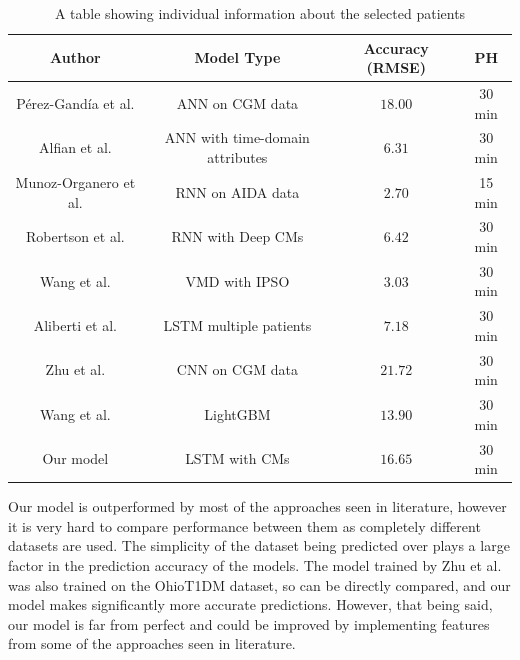       \begin{table}[H]
        \begin{center}
          \caption{A table showing individual information about the selected patients}
          \begin{tabular}{||c c c c||} 
          \hline
          Author & Model Type & Accuracy (RMSE) & PH \\ [0.5ex] 
          \hline\hline
          Pérez-Gandía et al. \cite{paper3} & ANN on CGM data & $18.00$ & 30 min \\ 
          \hline
          Alfian et al. \cite{paper5} & ANN with time-domain attributes & $6.31$ & 30 min \\
          \hline
          Munoz-Organero et al. \cite{paper6} & RNN on AIDA data & $2.70$ & 15 min \\
          \hline
          Robertson et al. \cite{paper1} & RNN with Deep CMs & $6.42$ & 30 min \\
          \hline
          Wang et al. \cite{paper8} & VMD with IPSO & $3.03$ & 30 min \\
          \hline
          Aliberti et al. \cite{paper9} & LSTM multiple patients & $7.18$ & 30 min \\
          \hline
          Zhu et al. \cite{paper7} & CNN on CGM data & $21.72$ & 30 min \\
          \hline
          Wang et al. \cite{paper10} & LightGBM & $13.90$ & 30 min \\
          \hline
          Our model & LSTM with CMs & $16.65$ & 30 min \\ [1ex]
          \hline 
          \end{tabular}
        \end{center}
      \end{table}

      Our model is outperformed by most of the approaches seen in literature, however it is very hard to compare performance between them as completely different datasets are used. The simplicity of the dataset being predicted over plays a large factor in the prediction accuracy of the models. The model trained by Zhu et al. \cite{paper7} was also trained on the OhioT1DM dataset, so can be directly compared, and our model makes significantly more accurate predictions. However, that being said, our model is far from perfect and could be improved by implementing features from some of the approaches seen in literature.



